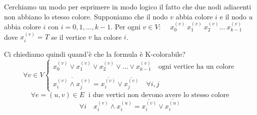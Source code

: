 \documentclass[a4paper]{article}
\theoremstyle{definition}
\begin{document}
 			Cerchiamo un modo per esprimere in modo logico il fatto che due nodi adiacenti non abbiano lo stesso colore.
 			Supponiamo che il nodo $ v $ abbia colore $ i $ e il nodo $ u $ abbia colore $ i $ con $ i= 0,1, \dots, k-1 $.
 			Per ogni $ v \in V $: $ \quad x_0^{(v)} \ x_1^{(v)} \ x_2^{(v)} \dots \ x_{k-1}^{(v)}  $ dove $ x_i^{(v)} = T $ se il vertice $ v $ ha colore $ i $.
 			
 			Ci chiediamo quindi quand'è che la formula è K-colorabile?
 			\[
	 			\forall v \in V
	 			\begin{cases}
		 			x_0^{(v)} \vee x_1^{(v)} \vee x_2^{(v)} \vee \dots \vee x_{k-1}^{(v)} \quad \text{ogni vertice ha un colore}\\ \\
		 			\overline{x_i^{(v)} \wedge x_j^{(v)}} = \overline{x_i^{(v)}} \vee \overline{x_j^{(v)}} \quad \forall i,j
	 			\end{cases}
 			\]
	 		\[
		 		\forall e =(u, v) \in E\ \text{ i due vertici non devono avere lo stesso colore}
	 		\]
	 		\[
		 		\forall i \quad \overline{x^{(v)}_i \wedge x_i^{(u)}} =
		 		\overline{x_i^{(v)}} \vee \overline{x_i^{(u)}}
	 		\]
	 		
\end{document}
